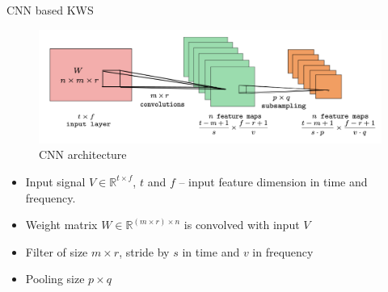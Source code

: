 \begin{frame}{CNN based KWS}
    \begin{figure}
    	\centering
    	\includegraphics[width=0.99\linewidth]{figs/cnn_kws.png}
    	\caption{CNN architecture}
    \end{figure}
    
    \begin{itemize}
        \item Input signal $V \in \mathbb{R}^{t\times f}$, $t$ and $f$ -- input feature dimension in time and frequency. 
        \item Weight matrix $W \in \mathbb{R}^{(m\times r)\times n}$ is convolved with input $V$
        \item Filter of size $m\times r$, stride by $s$ in time and $v$ in frequency
        \item Pooling size $p \times q$
    \end{itemize}
    

\end{frame}
